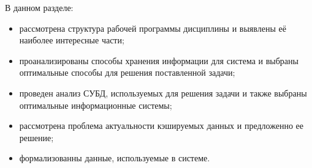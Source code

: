В данном разделе:

\begin{itemize}
 \item рассмотрена структура рабочей программы дисциплины и выявлены её наиболее интересные части;
 \item проанализированы способы хранения информации для система и выбраны оптимальные способы для решения поставленной задачи; 
 \item проведен анализ СУБД, используемых для решения задачи и также выбраны оптимальные информационные системы; 
 \item рассмотрена проблема актуальности кэшируемых данных и предложенно ее решение;
 \item формализованны данные, используемые в системе.
\end{itemize}

